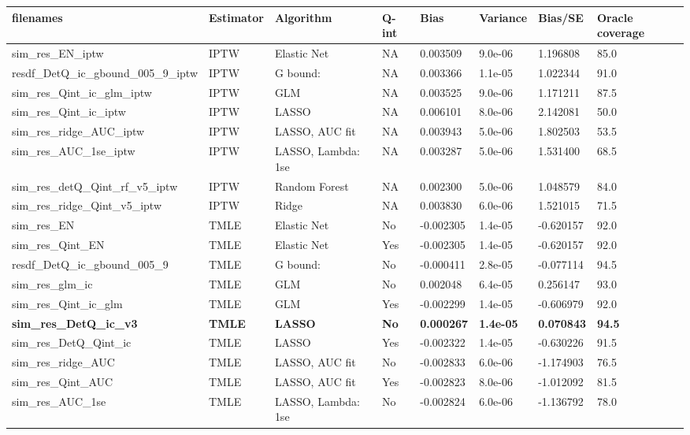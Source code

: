 
\begin{longtable}[l]{llllllll}
\toprule
filenames & Estimator & Algorithm & Q-int & Bias & Variance & Bias/SE & Oracle coverage\\
\midrule
sim\_res\_EN\_iptw & IPTW & Elastic Net & NA & 0.003509 & 9.0e-06 & 1.196808 & 85.0\\
resdf\_DetQ\_ic\_gbound\_005\_9\_iptw & IPTW & G bound: & NA & 0.003366 & 1.1e-05 & 1.022344 & 91.0\\
sim\_res\_Qint\_ic\_glm\_iptw & IPTW & GLM & NA & 0.003525 & 9.0e-06 & 1.171211 & 87.5\\
sim\_res\_Qint\_ic\_iptw & IPTW & LASSO & NA & 0.006101 & 8.0e-06 & 2.142081 & 50.0\\
sim\_res\_ridge\_AUC\_iptw & IPTW & LASSO, AUC fit & NA & 0.003943 & 5.0e-06 & 1.802503 & 53.5\\
sim\_res\_AUC\_1se\_iptw & IPTW & LASSO, Lambda: 1se & NA & 0.003287 & 5.0e-06 & 1.531400 & 68.5\\
sim\_res\_detQ\_Qint\_rf\_v5\_iptw & IPTW & Random Forest & NA & 0.002300 & 5.0e-06 & 1.048579 & 84.0\\
sim\_res\_ridge\_Qint\_v5\_iptw & IPTW & Ridge & NA & 0.003830 & 6.0e-06 & 1.521015 & 71.5\\
sim\_res\_EN & TMLE & Elastic Net & No & -0.002305 & 1.4e-05 & -0.620157 & 92.0\\
sim\_res\_Qint\_EN & TMLE & Elastic Net & Yes & -0.002305 & 1.4e-05 & -0.620157 & 92.0\\
resdf\_DetQ\_ic\_gbound\_005\_9 & TMLE & G bound: & No & -0.000411 & 2.8e-05 & -0.077114 & 94.5\\
sim\_res\_glm\_ic & TMLE & GLM & No & 0.002048 & 6.4e-05 & 0.256147 & 93.0\\
sim\_res\_Qint\_ic\_glm & TMLE & GLM & Yes & -0.002299 & 1.4e-05 & -0.606979 & 92.0\\
\midrule
\textbf{sim\_res\_DetQ\_ic\_v3} & \textbf{TMLE} & \textbf{LASSO} & \textbf{No} & \textbf{0.000267} & \textbf{1.4e-05} & \textbf{0.070843} & \textbf{94.5}\\
\midrule
sim\_res\_DetQ\_Qint\_ic & TMLE & LASSO & Yes & -0.002322 & 1.4e-05 & -0.630226 & 91.5\\
sim\_res\_ridge\_AUC & TMLE & LASSO, AUC fit & No & -0.002833 & 6.0e-06 & -1.174903 & 76.5\\
sim\_res\_Qint\_AUC & TMLE & LASSO, AUC fit & Yes & -0.002823 & 8.0e-06 & -1.012092 & 81.5\\
sim\_res\_AUC\_1se & TMLE & LASSO, Lambda: 1se & No & -0.002824 & 6.0e-06 & -1.136792 & 78.0\\

\end{longtable}
